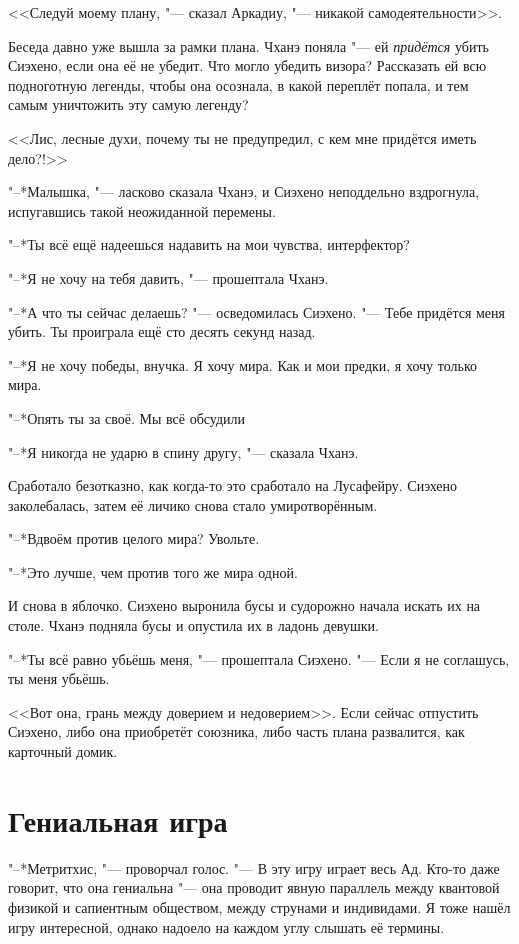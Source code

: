 \documentclass[a4paper,10pt]{book}
\newcommand{\ldotst}{\so{...}\xspace}
\begin{document}
<<Следуй моему плану, "--- сказал Аркадиу, "--- никакой самодеятельности>>.

Беседа давно уже вышла за рамки плана. Чханэ поняла "--- ей \textit{придётся} 
убить Сиэхено, если она её не убедит. Что могло убедить визора? Рассказать ей 
всю подноготную легенды, чтобы она осознала, в какой переплёт попала, и тем 
самым уничтожить эту самую легенду?

<<Лис, лесные духи, почему ты не предупредил, с кем мне придётся иметь дело?!>>

"--*Малышка, "--- ласково сказала Чханэ, и Сиэхено неподдельно вздрогнула, 
испугавшись такой неожиданной перемены.

"--*Ты всё ещё надеешься надавить на мои чувства, интерфектор?

"--*Я не хочу на тебя давить, "--- прошептала Чханэ.

"--*А что ты сейчас делаешь? "--- осведомилась Сиэхено. "--- Тебе придётся меня 
убить. Ты проиграла ещё сто десять секунд назад.

"--*Я не хочу победы, внучка. Я хочу мира. Как и мои предки, я хочу только мира.

"--*Опять ты за своё. Мы всё обсудили\ldotst

"--*Я никогда не ударю в спину другу, "--- сказала Чханэ.

Сработало безотказно, как когда-то это сработало на Лусафейру. Сиэхено 
заколебалась, затем её личико снова стало умиротворённым.

"--*Вдвоём против целого мира? Увольте.

"--*Это лучше, чем против того же мира одной.

И снова в яблочко. Сиэхено выронила бусы и судорожно начала искать их на столе. 
Чханэ подняла бусы и опустила их в ладонь девушки.

"--*Ты всё равно убьёшь меня, "--- прошептала Сиэхено. "--- Если я не 
соглашусь, ты меня убьёшь.

<<Вот она, грань между доверием и недоверием>>. Если сейчас отпустить Сиэхено, 
либо она приобретёт союзника, либо часть плана развалится, как карточный домик.

\section{Гениальная игра}

"--*Метритхис, "--- проворчал голос. "--- В эту игру играет весь Ад. Кто-то 
даже говорит, что она гениальна "--- она проводит явную параллель между 
квантовой физикой
и сапиентным обществом, между струнами и индивидами. Я тоже нашёл игру 
интересной, 
однако надоело на каждом углу слышать её термины.
\end{document}
